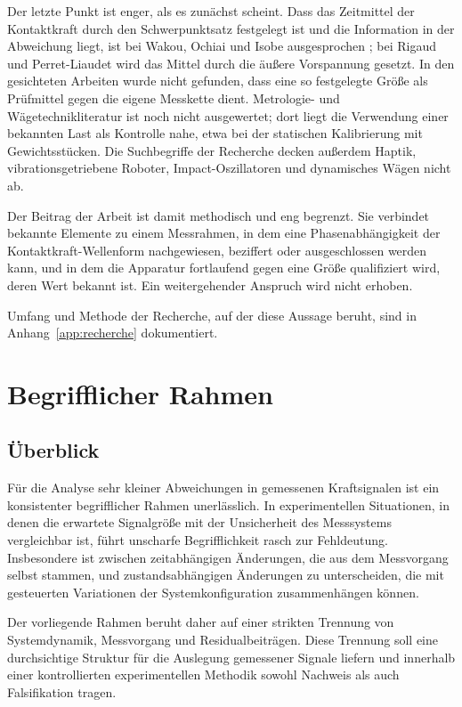 \documentclass[12pt,a4paper]{report}
\begin{document}
Der letzte Punkt ist enger, als es zunächst scheint. Dass das Zeitmittel
der Kontaktkraft durch den Schwerpunktsatz festgelegt ist und die
Information in der Abweichung liegt, ist bei Wakou, Ochiai und Isobe
ausgesprochen \cite{wakou2008}; bei Rigaud und Perret-Liaudet wird das
Mittel durch die äußere Vorspannung gesetzt. In den gesichteten Arbeiten
wurde nicht gefunden, dass eine so festgelegte Größe als Prüfmittel gegen
die eigene Messkette dient. Metrologie- und Wägetechnikliteratur ist noch
nicht ausgewertet; dort liegt die Verwendung einer bekannten Last als
Kontrolle nahe, etwa bei der statischen Kalibrierung mit Gewichtsstücken.
Die Suchbegriffe der Recherche decken außerdem Haptik, vibrationsgetriebene
Roboter, Impact-Oszillatoren und dynamisches Wägen nicht ab.

Der Beitrag der Arbeit ist damit methodisch und eng begrenzt. Sie
verbindet bekannte Elemente zu einem Messrahmen, in dem eine
Phasenabhängigkeit der Kontaktkraft-Wellenform nachgewiesen, beziffert
oder ausgeschlossen werden kann, und in dem die Apparatur fortlaufend
gegen eine Größe qualifiziert wird, deren Wert bekannt ist. Ein
weitergehender Anspruch wird nicht erhoben.

Umfang und Methode der Recherche, auf der diese Aussage beruht, sind in
Anhang~\ref{app:recherche} dokumentiert.



\chapter{Begrifflicher Rahmen}
\label{chap:rahmen}

\section{Überblick}

Für die Analyse sehr kleiner Abweichungen in gemessenen Kraftsignalen ist
ein konsistenter begrifflicher Rahmen unerlässlich. In experimentellen
Situationen, in denen die erwartete Signalgröße mit der Unsicherheit des
Messsystems vergleichbar ist, führt unscharfe Begrifflichkeit rasch zur
Fehldeutung. Insbesondere ist zwischen zeitabhängigen Änderungen, die aus
dem Messvorgang selbst stammen, und zustandsabhängigen Änderungen zu
unterscheiden, die mit gesteuerten Variationen der Systemkonfiguration
zusammenhängen können.

Der vorliegende Rahmen beruht daher auf einer strikten Trennung von
Systemdynamik, Messvorgang und Residualbeiträgen. Diese Trennung soll
eine durchsichtige Struktur für die Auslegung gemessener Signale liefern
und innerhalb einer kontrollierten experimentellen Methodik sowohl
Nachweis als auch Falsifikation tragen.
\end{document}
